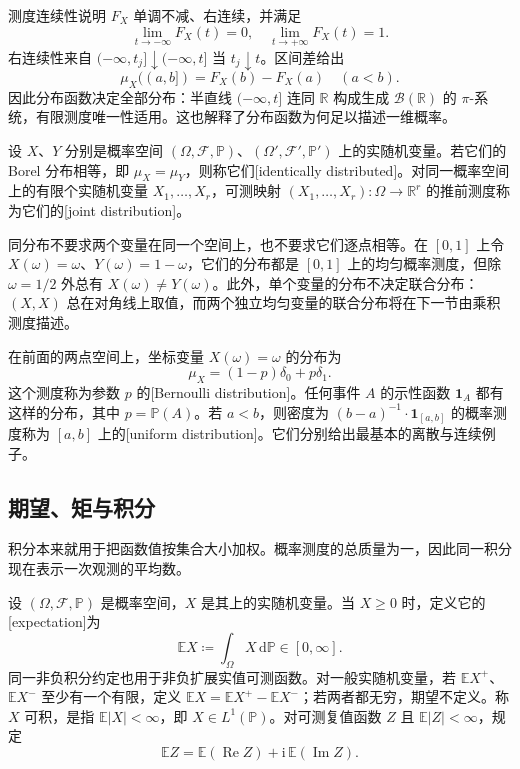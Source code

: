 测度连续性说明 \(F_X\) 单调不减、右连续，并满足
\[
 \lim_{t\to-\infty}F_X(t)=0,
 \quad \lim_{t\to+\infty}F_X(t)=1.
\]
右连续性来自 \(({-\infty},t_j]\downarrow({-\infty},t]\) 当 \(t_j\downarrow t\)。区间差给出
\[
 \mu_X((a,b])=F_X(b)-F_X(a)\quad(a<b).
\]
因此分布函数决定全部分布：半直线 \(({-\infty},t]\) 连同 \(\mathbb R\) 构成生成 \(\mathcal B(\mathbb R)\) 的 \(\pi\)-系统，有限测度唯一性适用。这也解释了分布函数为何足以描述一维概率。

\begin{definition}\label{b1:def:30-equal-laws}
设 \(X\)、\(Y\) 分别是概率空间 \((\Omega,\mathcal F,\mathbb P)\)、\((\Omega',\mathcal F',\mathbb P')\) 上的实随机变量。若它们的 Borel 分布相等，即 \(\mu_X=\mu_Y\)，则称它们[identically distributed]。对同一概率空间上的有限个实随机变量 \(X_1,\ldots,X_r\)，可测映射 \((X_1,\ldots,X_r):\Omega\to\mathbb R^r\) 的推前测度称为它们的[joint distribution]。
\end{definition}

同分布不要求两个变量在同一个空间上，也不要求它们逐点相等。在 \([0,1]\) 上令 \(X(\omega)=\omega\)、\(Y(\omega)=1-\omega\)，它们的分布都是 \([0,1]\) 上的均匀概率测度，但除 \(\omega=1/2\) 外总有 \(X(\omega)\ne Y(\omega)\)。此外，单个变量的分布不决定联合分布：\((X,X)\) 总在对角线上取值，而两个独立均匀变量的联合分布将在下一节由乘积测度描述。

\ProseParagraphBreak

在前面的两点空间上，坐标变量 \(X(\omega)=\omega\) 的分布为
\[
 \mu_X=(1-p)\delta_0+p\delta_1.
\]
这个测度称为参数 \(p\) 的[Bernoulli distribution]。任何事件 \(A\) 的示性函数 \(\mathbf1_A\) 都有这样的分布，其中 \(p=\mathbb P(A)\)。若 \(a<b\)，则密度为 \((b-a)^{-1}\cdot\mathbf1_{[a,b]}\) 的概率测度称为 \([a,b]\) 上的[uniform distribution]。它们分别给出最基本的离散与连续例子。

\subsection{期望、矩与积分}
\label{b1:subsec:300103}

积分本来就用于把函数值按集合大小加权。概率测度的总质量为一，因此同一积分现在表示一次观测的平均数。

\begin{definition}\label{b1:def:30-expectation}
设 \((\Omega,\mathcal F,\mathbb P)\) 是概率空间，\(X\) 是其上的实随机变量。当 \(X\geq0\) 时，定义它的[expectation]为
\[
 \mathbb E X\coloneqq\int_\Omega X\,\mathrm d\mathbb P\in[0,\infty].
\]
同一非负积分约定也用于非负扩展实值可测函数。对一般实随机变量，若 \(\mathbb E X^+\)、\(\mathbb E X^-\) 至少有一个有限，定义 \(\mathbb E X=\mathbb E X^+-\mathbb E X^-\)；若两者都无穷，期望不定义。称 \(X\) 可积，是指 \(\mathbb E|X|<\infty\)，即 \(X\in L^1(\mathbb P)\)。对可测复值函数 \(Z\) 且 \(\mathbb E|Z|<\infty\)，规定
\[
 \mathbb E Z=\mathbb E(\operatorname{Re}Z)
 +\mathrm i\,\mathbb E(\operatorname{Im}Z).
\]
\end{definition}

